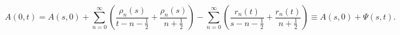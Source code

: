 \begin{equation}
A(0,t) = A(s,0) + \sum_{n=0}^\infty
\left(
\frac{\rho_n(s)}{t-n-\frac{1}{2}}+\frac{\rho_n(s)}{n+\frac{1}{2}}
\right)
-\sum_{n=0}^\infty
\left(
\frac{r_n(t)}{s-n-\frac{1}{2}}+\frac{r_n(t)}{n+\frac{1}{2}}
\right)   \equiv
A(s,0)+\Psi(s,t).
\label{7}
\end{equation}

